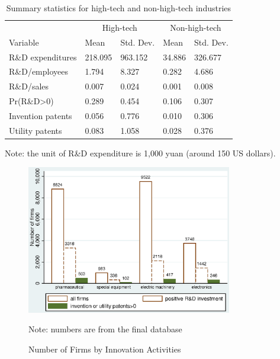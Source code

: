\documentclass[English]{article}
\begin{document}
\begin{center}
\begin{table}[H]
\caption{Summary statistics for high-tech and non-high-tech industries}
\label{T2}
\begin{centering}
\begin{tabular}{lllll}
\hline\hline
 & \multicolumn{2}{c}{High-tech} & \multicolumn{2}{c}{Non-high-tech} \\ \cmidrule{2-5}
Variable & Mean & Std. Dev. & Mean & Std. Dev.\\
\hline
R\&D expenditures & 218.095 & 963.152 & 34.886 & 326.677\\
R\&D/employees & 1.794 & 8.327 & 0.282 & 4.686\\
R\&D/sales & 0.007 & 0.024 & 0.001 & 0.008\\
Pr(R\&D>0) &0.289 & 0.454 & 0.106 &0.307 \\
Invention patents & 0.056 & 0.776 & 0.010 & 0.306\\
Utility patents & 0.083 & 1.058 & 0.028 & 0.376\\
\hline\hline
\end{tabular}
\par\end{centering}
{\small{}Note: the unit of R\&D expenditure is 1,000 yuan (around
150 US dollars).}{\small \par}
\end{table}
\par\end{center}




\begin{center}
\begin{figure}[H]

\caption{Number of Firms by Innovation Activities} 
\label{F1}
\begin{centering}
\includegraphics[width=0.8\textwidth]{FirmsCount.eps}
\par\end{centering}

{\small{}Note: numbers are from the final database}{\small \par}
\end{figure}

\par\end{center}
\end{document}
